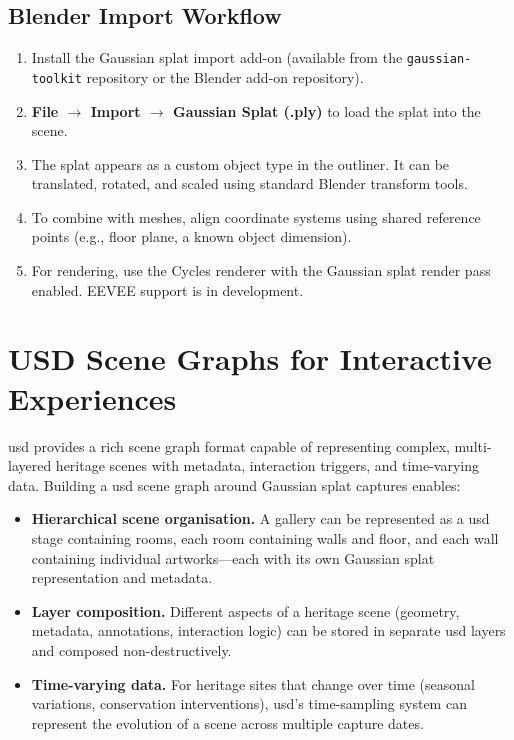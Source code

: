 \subsection{Blender Import Workflow}

\begin{enumerate}
  \item Install the Gaussian splat import add-on (available from the \texttt{gaussian-toolkit} repository or the Blender add-on repository).
  \item \textbf{File $\rightarrow$ Import $\rightarrow$ Gaussian Splat (.ply)} to load the splat into the scene.
  \item The splat appears as a custom object type in the outliner. It can be translated, rotated, and scaled using standard Blender transform tools.
  \item To combine with meshes, align coordinate systems using shared reference points (e.g., floor plane, a known object dimension).
  \item For rendering, use the Cycles renderer with the Gaussian splat render pass enabled. EEVEE support is in development.
\end{enumerate}

\section{USD Scene Graphs for Interactive Experiences}
\label{sec:adv-usd}

\acrlong{usd} provides a rich scene graph format capable of representing complex, multi-layered heritage scenes with metadata, interaction triggers, and time-varying data. Building a \acrshort{usd} scene graph around Gaussian splat captures enables:

\begin{itemize}
  \item \textbf{Hierarchical scene organisation.} A gallery can be represented as a \acrshort{usd} stage containing rooms, each room containing walls and floor, and each wall containing individual artworks---each with its own Gaussian splat representation and metadata.
  \item \textbf{Layer composition.} Different aspects of a heritage scene (geometry, metadata, annotations, interaction logic) can be stored in separate \acrshort{usd} layers and composed non-destructively.
  \item \textbf{Time-varying data.} For heritage sites that change over time (seasonal variations, conservation interventions), \acrshort{usd}'s time-sampling system can represent the evolution of a scene across multiple capture dates.
\end{itemize}

